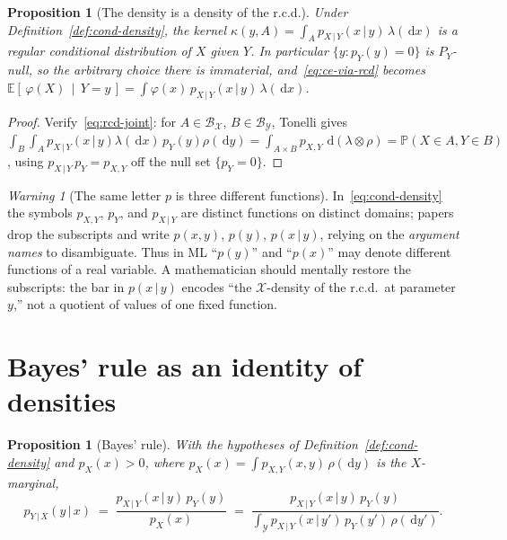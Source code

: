 \documentclass[11pt,oneside]{report}
\theoremstyle{plain}
\newtheorem{proposition}[theorem]{Proposition}
\theoremstyle{definition}
\theoremstyle{remark}
\newtheorem{warning}[theorem]{Warning}
\newcommand{\Prob}{\mathbb{P}}
\newcommand{\E}{\mathbb{E}}
\newcommand{\dd}{\,\mathrm{d}}
\newcommand{\Bcal}{\mathcal{B}}
\newcommand{\Xcal}{\mathcal{X}}
\newcommand{\Ycal}{\mathcal{Y}}
\newcommand{\given}{\,\vert\,}
\newcommand{\cE}[2]{\E\!\left[\,#1 \,\middle|\, #2\,\right]}
\numberwithin{equation}{chapter}
\begin{document}
\begin{proposition}[The density is a density of the r.c.d.]
\label{prop:density-is-rcd}
Under Definition~\ref{def:cond-density}, the kernel
$\kappa(y,A)=\int_A p_{X\given Y}(x\given y)\,\lambda(\dd x)$ is a regular
conditional distribution of $X$ given $Y$. In particular
$\{y:p_Y(y)=0\}$ is $P_Y$-null, so the arbitrary choice there is immaterial,
and~\eqref{eq:ce-via-rcd} becomes
$\cE{\varphi(X)}{Y=y}=\int\varphi(x)\,p_{X\given Y}(x\given y)\,\lambda(\dd x)$.
\end{proposition}
\begin{proof}
Verify~\eqref{eq:rcd-joint}: for $A\in\Bcal_\Xcal$, $B\in\Bcal_\Ycal$,
Tonelli gives
$\int_B\!\int_A p_{X\given Y}(x\given y)\lambda(\dd x)\,p_Y(y)\rho(\dd y)
=\int_{A\times B}p_{X,Y}\,\dd(\lambda\otimes\rho)=\Prob(X\in A,Y\in B)$,
using $p_{X\given Y}\,p_Y=p_{X,Y}$ off the null set $\{p_Y=0\}$.
\end{proof}

\begin{warning}[The same letter $p$ is three different functions]
In~\eqref{eq:cond-density} the symbols $p_{X,Y}$, $p_Y$, and
$p_{X\given Y}$ are distinct functions on distinct domains; papers drop the
subscripts and write $p(x,y)$, $p(y)$, $p(x\given y)$, relying on the
\emph{argument names} to disambiguate. Thus in ML ``$p(y)$'' and
``$p(x)$'' may denote different functions of a real variable. A
mathematician should mentally restore the subscripts: the bar in
$p(x\given y)$ encodes ``the $\Xcal$-density of the r.c.d.\ at parameter
$y$,'' not a quotient of values of one fixed function.
\end{warning}

\section{Bayes' rule as an identity of densities}

\begin{proposition}[Bayes' rule]\label{prop:bayes}
With the hypotheses of Definition~\ref{def:cond-density} and $p_X(x)>0$,
where $p_X(x)=\int p_{X,Y}(x,y)\,\rho(\dd y)$ is the $X$-marginal,
\begin{equation}\label{eq:bayes}
  p_{Y\given X}(y\given x)
   \;=\;\frac{p_{X\given Y}(x\given y)\,p_Y(y)}{p_X(x)}
   \;=\;\frac{p_{X\given Y}(x\given y)\,p_Y(y)}
            {\displaystyle\int_\Ycal p_{X\given Y}(x\given y')\,p_Y(y')\,\rho(\dd y')}.
\end{equation}
\end{proposition}
\end{document}
